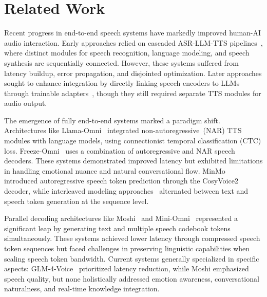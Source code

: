 \section{Related Work}
\noindent Recent progress in end-to-end speech systems have markedly improved human-AI audio interaction. Early approaches relied on cascaded ASR-LLM-TTS pipelines~\citep{huang2023audiogptunderstandinggeneratingspeech}, where distinct modules for speech recognition, language modeling, and speech synthesis are sequentially connected. However, these systems suffered from latency buildup, error propagation, and disjointed optimization. Later approaches sought to enhance integration by directly linking speech encoders to LLMs through trainable adapters~\citep{kong2020pannslargescalepretrainedaudio, chu2024qwen2audiotechnicalreport, das2024speechverselargescalegeneralizableaudio}, though they still required separate TTS modules for audio output. 

\bigskip
\noindent The emergence of fully end-to-end systems marked a paradigm shift. Architectures like Llama-Omni~\citep{fang2024llamaomniseamlessspeechinteraction} integrated non-autoregressive~(NAR) TTS modules with language models, using connectionist temporal classification (CTC) loss. Freeze-Omni~\citep{wang2024freezeomnismartlowlatency} uses a combination of autoregressive and NAR speech decoders. These systems demonstrated improved latency but exhibited limitations in handling emotional nuance and natural conversational flow. MinMo~\citep{chen2025minmomultimodallargelanguage} introduced autoregressive speech token prediction through the CosyVoice2~\citep{du2024cosyvoice2scalablestreaming} decoder, while interleaved modeling approaches~\citep{zeng2024glm4voiceintelligenthumanlikeendtoend, nguyen2024spiritlminterleavedspoken} alternated between text and speech token generation at the sequence level.

\bigskip
\noindent Parallel decoding architectures like Moshi~\citep{2024moshispeechtextfoundationmodel} and Mini-Omni~\citep{xie2024miniomnilanguagemodelshear} represented a significant leap by generating text and multiple speech codebook tokens simultaneously. These systems achieved lower latency through compressed speech token sequences but faced challenges in preserving linguistic capabilities when scaling speech token bandwidth. Current systems generally specialized in specific aspects: GLM-4-Voice~\citep{zeng2024glm4voiceintelligenthumanlikeendtoend} prioritized latency reduction, while Moshi emphasized speech quality, but none holistically addressed emotion awareness, conversational naturalness, and real-time knowledge integration.

